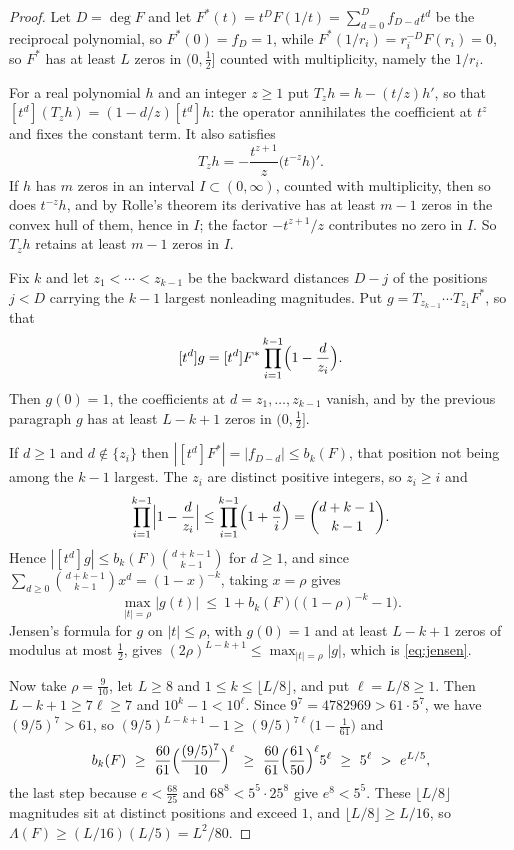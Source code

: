 \documentclass[11pt]{article}
\begin{document}
\begin{proof}
Let $D=\deg F$ and let $F^*(t)=t^DF(1/t)=\sum_{d=0}^Df_{D-d}t^d$ be the
reciprocal polynomial, so $F^*(0)=f_D=1$, while
$F^*(1/r_i)=r_i^{-D}F(r_i)=0$, so $F^*$ has at least $L$ zeros in $(0,\tfrac12]$ counted with multiplicity,
namely the $1/r_i$.

For a real polynomial $h$ and an integer $z\ge1$ put $T_zh=h-(t/z)h'$, so that
$[t^d](T_zh)=(1-d/z)[t^d]h$: the operator annihilates the coefficient at
$t^z$ and fixes the constant term.  It also satisfies
\[
  T_zh=-\frac{t^{z+1}}z\bigl(t^{-z}h\bigr)' .
\]
If $h$ has $m$ zeros in an interval $I\subset(0,\infty)$, counted with
multiplicity, then so does $t^{-z}h$, and by Rolle's theorem its derivative
has at least $m-1$ zeros in the convex hull of them, hence in $I$; the factor
$-t^{z+1}/z$ contributes no zero in $I$.  So $T_zh$ retains at least $m-1$
zeros in $I$.

Fix $k$ and let $z_1<\cdots<z_{k-1}$ be the backward distances $D-j$ of the
positions $j<D$ carrying the $k-1$ largest nonleading magnitudes.  Put
$g=T_{z_{k-1}}\cdots T_{z_1}F^*$, so that
\[
  [t^d]g=[t^d]F^*\prod_{i=1}^{k-1}\Bigl(1-\frac d{z_i}\Bigr).
\]
Then $g(0)=1$, the coefficients at $d=z_1,\ldots,z_{k-1}$ vanish, and by the
previous paragraph $g$ has at least $L-k+1$ zeros in $(0,\tfrac12]$.

If $d\ge1$ and $d\notin\{z_i\}$ then $|[t^d]F^*|=|f_{D-d}|\le b_k(F)$, that
position not being among the $k-1$ largest.  The $z_i$ are distinct positive
integers, so $z_i\ge i$ and
\[
  \prod_{i=1}^{k-1}\Bigl|1-\frac d{z_i}\Bigr|
  \le\prod_{i=1}^{k-1}\Bigl(1+\frac di\Bigr)=\binom{d+k-1}{k-1} .
\]
Hence $|[t^d]g|\le b_k(F)\binom{d+k-1}{k-1}$ for $d\ge1$, and since
$\sum_{d\ge0}\binom{d+k-1}{k-1}x^d=(1-x)^{-k}$, taking $x=\rho$ gives
\[
  \max_{|t|=\rho}|g(t)|\ \le\ 1+b_k(F)\bigl((1-\rho)^{-k}-1\bigr).
\]
Jensen's formula for $g$ on $|t|\le\rho$, with $g(0)=1$ and at least
$L-k+1$ zeros of modulus at most $\tfrac12$, gives
$(2\rho)^{L-k+1}\le\max_{|t|=\rho}|g|$, which is \eqref{eq:jensen}.

Now take $\rho=\tfrac9{10}$, let $L\ge8$ and $1\le k\le\lfloor L/8\rfloor$,
and put $\ell=L/8\ge1$.  Then $L-k+1\ge7\ell\ge7$ and $10^k-1<10^\ell$.
Since $9^7=4782969>61\cdot5^7$, we have $(9/5)^7>61$, so
$(9/5)^{L-k+1}-1\ge(9/5)^{7\ell}\bigl(1-\tfrac1{61}\bigr)$ and
\[
  b_k(F)\ \ge\ \frac{60}{61}\Bigl(\frac{(9/5)^7}{10}\Bigr)^{\ell}
  \ \ge\ \frac{60}{61}\Bigl(\frac{61}{50}\Bigr)^{\ell}5^\ell\ \ge\ 5^\ell\ >\ e^{L/5},
\]
the last step because $e<\tfrac{68}{25}$ and $68^8<5^5\cdot25^8$ give $e^8<5^5$.  These $\lfloor L/8\rfloor$
magnitudes sit at distinct positions and exceed $1$, and
$\lfloor L/8\rfloor\ge L/16$, so $\Lambda(F)\ge(L/16)(L/5)=L^2/80$.
\end{proof}
\end{document}
